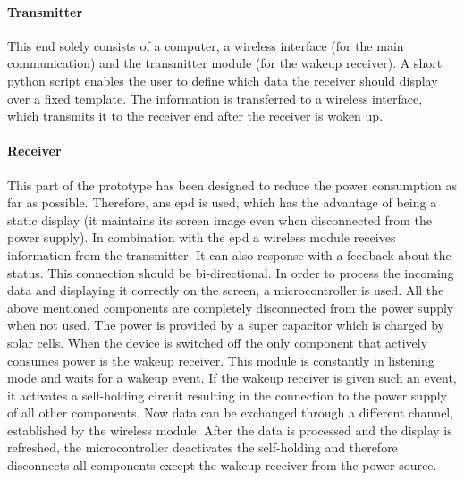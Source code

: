 \paragraph{Transmitter}
This end solely consists of a computer, a wireless interface (for the main communication) and the transmitter module (for the wakeup receiver). A short python script enables the user to define which data the receiver should display over a fixed template. The information is transferred to a wireless interface, which transmits it to the receiver end after the receiver is woken up.

\paragraph{Receiver}
This part of the prototype has been designed to reduce the power consumption as far as possible. Therefore, ans \acs{epd} is used, which has the advantage of being a static display (it maintains its screen image even when disconnected from the power supply). In combination with the \acs{epd} a wireless module receives information from the transmitter. It can also response with a feedback about the status. This connection should be bi-directional. In order to process the incoming data and displaying it correctly on the screen, a microcontroller is used. All the above mentioned components  are completely disconnected from the power supply when not used. The power is provided by a super capacitor which is charged by solar cells. When the device  is switched off the only component that actively consumes power is the wakeup receiver. This module is constantly in listening mode and waits for a wakeup event. If the wakeup receiver is given such an event, it activates a self-holding circuit resulting in the connection to the power supply of all other components. Now data can be exchanged through a different channel, established by the wireless module. After the data is processed and the display is refreshed, the microcontroller deactivates the self-holding and therefore disconnects all components except the wakeup receiver from the power source.